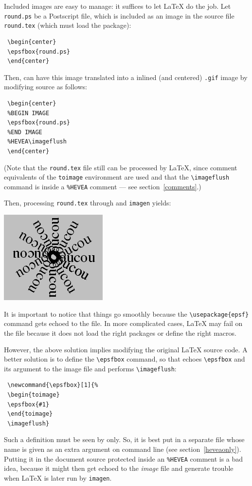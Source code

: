 Included images are easy to manage: it suffices to let \LaTeX{} do the
job.
Let \texttt{round.ps} be a Postscript file, which is included as an
image in the source file \texttt{round.tex} (which must load the
 package):
\begin{verbatim}
 \begin{center}
 \epsfbox{round.ps}
 \end{center}
\end{verbatim}
Then, \hevea{} can have this image translated into a inlined (and
centered) \texttt{.gif} image by modifying source as follows:
\begin{verbatim}
 \begin{center}
 %BEGIN IMAGE
 \epsfbox{round.ps}
 %END IMAGE
 %HEVEA\imageflush
 \end{center}
\end{verbatim}
(Note that the \texttt{round.tex} file
still can be processed by \LaTeX, since comment equivalents
of the \texttt{toimage} environment are used and that
the \verb+\imageflush+ command is  inside
a \verb+%HEVEA+ comment --- see section~\ref{comments}.)

Then, processing \texttt{round.tex} through \hevea{} and
\texttt{imagen} yields:
\begin{htmlout}
\begin{center}
\includegraphics{round}%
\end{center}
\end{htmlout}
It is important to notice that things go smoothly because the
\verb+\usepackage{epsf}+ command  gets echoed to the
 file.  In more complicated cases, \LaTeX{} may fail
on the  file because it does not load the right
packages or define the right macros.


However, the above solution implies modifying the original \LaTeX{}
source code.
A better solution is to define the \verb+\epsfbox+
command, so that \hevea{} echoes  \verb+\epsfbox+ and its argument to
the image file and performs \verb+\imageflush+:
\begin{verbatim}
 \newcommand{\epsfbox}[1]{%
 \begin{toimage}
 \epsfbox{#1}
 \end{toimage}
 \imageflush}
\end{verbatim}
Such a definition must be seen by \hevea{} only. So, it is best put
in a separate file whose name is given as an extra argument on
\hevea{} command line (see section~\ref{heveaonly}).
Putting it in the document source
protected inside an \verb+%HEVEA+ comment is a bad idea, %
because it might then get echoed to the \textit{image} file
and generate trouble when \LaTeX{} is later run by \texttt{imagen}.

